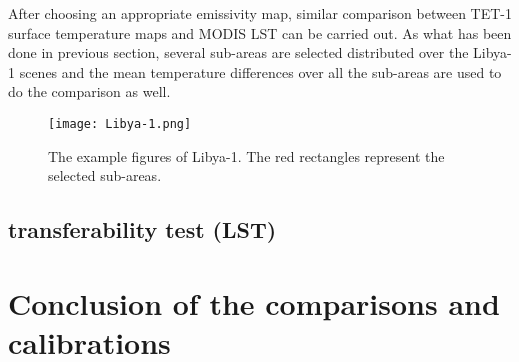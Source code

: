 \noindent After choosing an appropriate emissivity map, similar comparison between TET-1 surface temperature maps and MODIS LST can be carried out. As what has been done in previous section, several sub-areas are selected distributed over the Libya-1 scenes and the mean temperature differences over all the sub-areas are used to do the comparison as well.\\

\begin{figure}[!htbp]
\centering
\texttt{[image: Libya-1.png]}
\caption{The example figures of Libya-1. The red rectangles represent the selected sub-areas.}
\label{fig:Libya1_sub_areas}
\end{figure}


\subsection{transferability test (LST)}


\section{Conclusion of the comparisons and calibrations}









